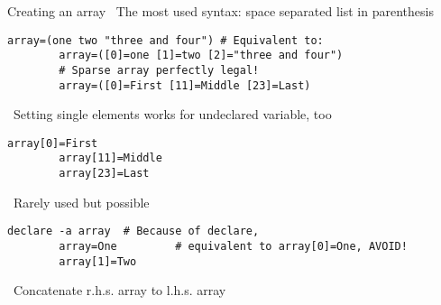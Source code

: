 \begin{frame}[fragile]{Creating an array}
    \vspace{-1mm}\centering
    \, The most used syntax: space separated list in parenthesis
    \smallskip
    \begin{lstlisting}[style=MyBash, numbers=none]
        array=(one two "three and four") # Equivalent to:
        array=([0]=one [1]=two [2]="three and four")
        # Sparse array perfectly legal!
        array=([0]=First [11]=Middle [23]=Last)
    \end{lstlisting}
    \medskip
    \, Setting single elements works for undeclared variable, too
    \smallskip
    \begin{lstlisting}[style=MyBash, numbers=none]
        array[0]=First
        array[11]=Middle
        array[23]=Last
    \end{lstlisting}
    \medskip
    \, Rarely used but possible
    \smallskip
    \begin{lstlisting}[style=MyBash, numbers=none]
        declare -a array  # Because of declare,
        array=One         # equivalent to array[0]=One, AVOID!
        array[1]=Two
    \end{lstlisting}
    \bigskip
    \, Concatenate r.h.s. array to l.h.s. array\par
\end{frame}
